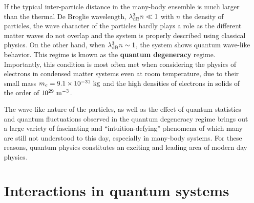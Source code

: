 \noindent If the typical inter-particle distance in the many-body ensemble is much larger than the thermal De Broglie wavelength, \ie $\lambda_{\rm{dB}}^3 n \ll 1$ with $n$ the density of particles, the wave character of the particles hardly plays a role as the different matter waves do not overlap and the system is properly described using classical physics. On the other hand, when $\lambda_{\rm{dB}}^3 n \sim 1$, the system shows quantum wave-like behavior. This regime is known as the \textbf{quantum degeneracy} regime. Importantly, this condition is most often met when considering the physics of electrons in condensed matter systems even at room temperature, due to their small mass $m_e = 9.1 \times 10^{-31} \ \rm{kg}$ and the high densities of electrons in solids of the order of $10^{29} \ \rm{m}^{-3}$.

The wave-like nature of the particles, as well as the effect of quantum statistics and quantum fluctuations observed in the quantum degeneracy regime brings out a large variety of fascinating and ``intuition-defying'' phenomena of which many are still not understood to this day, especially in many-body systems. For these reasons, quantum physics constitutes an exciting and leading area of modern day physics.

\section*{Interactions in quantum systems}

